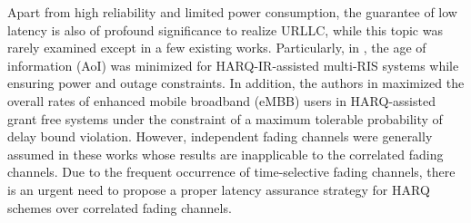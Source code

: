 \documentclass[conference]{IEEEtran}
\begin{document}
Apart from high reliability and limited power consumption, the guarantee of low latency is also of profound significance to realize URLLC, while this topic was rarely examined except in a few existing works. Particularly,
in \cite{10015032}, the age of information (AoI) was minimized for HARQ-IR-assisted multi-RIS systems while ensuring power and outage constraints. %
In addition, the authors in \cite{9606298} maximized the overall rates of enhanced mobile broadband (eMBB) users in HARQ-assisted grant free systems under the constraint of a maximum tolerable probability of delay bound violation. However, independent fading channels were generally assumed in these works \cite{9473556, 9089002, 9211722, 10015032, 9606298} whose results are inapplicable to the correlated fading channels. Due to the frequent occurrence of time-selective fading channels, there is an urgent need to propose a proper latency assurance strategy for HARQ schemes over correlated fading channels. %
\end{document}
